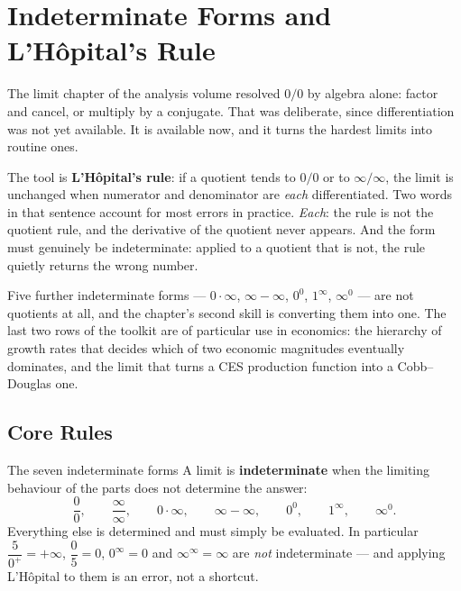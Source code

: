 \chapter{Indeterminate Forms and L'H\^opital's Rule}

The limit chapter of the analysis volume resolved $0/0$ by algebra alone:
factor and cancel, or multiply by a conjugate. That was deliberate, since
differentiation was not yet available. It is available now, and it turns the
hardest limits into routine ones.

The tool is \textbf{L'H\^opital's rule}: if a quotient tends to $0/0$ or to
$\infty/\infty$, the limit is unchanged when numerator and denominator are
\emph{each} differentiated. Two words in that sentence account for most errors in
practice. \emph{Each}: the rule is not the quotient rule, and the derivative
of the quotient never appears. And the form must genuinely be
indeterminate: applied to a quotient that is not, the rule quietly returns
the wrong number.

Five further indeterminate forms --- $0\cdot\infty$, $\infty-\infty$,
$0^{0}$, $1^{\infty}$, $\infty^{0}$ --- are not quotients at all, and the
chapter's second skill is converting them into one. The last two rows of
the toolkit are of particular use in economics: the
hierarchy of growth rates that decides which of two economic magnitudes
eventually dominates, and the limit that turns a CES production function
into a Cobb--Douglas one.

\section{Core Rules}

\begin{rulebox}{The seven indeterminate forms}
A limit is \textbf{indeterminate} when the limiting behaviour of the parts
does not determine the answer:
\[
  \frac{0}{0},\qquad \frac{\infty}{\infty},\qquad 0\cdot\infty,\qquad
  \infty-\infty,\qquad 0^{0},\qquad 1^{\infty},\qquad \infty^{0} .
\]
Everything else is determined and must simply be evaluated. In particular
$\dfrac{5}{0^{+}}=+\infty$, $\dfrac{0}{5}=0$, $0^{\infty}=0$ and
$\infty^{\infty}=\infty$ are \emph{not} indeterminate --- and applying
L'H\^opital to them is an error, not a shortcut.
\end{rulebox}

